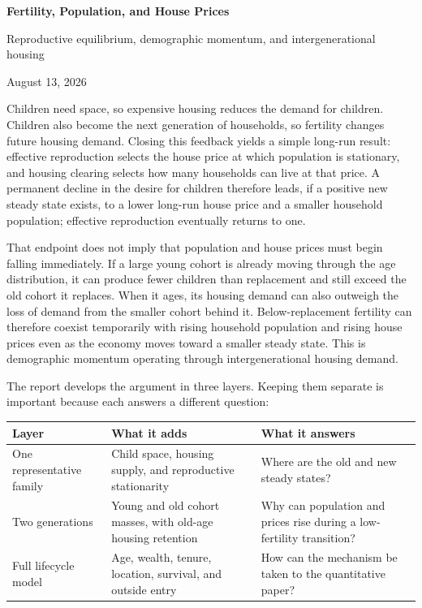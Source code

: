 \documentclass[11pt]{article}
\theoremstyle{definition}
\begin{document}
\begin{center}
{\LARGE\bfseries Fertility, Population, and House Prices}\par
\vspace{3pt}
{\large Reproductive equilibrium, demographic momentum, and intergenerational housing}\par
\vspace{3pt}
{\small August 13, 2026}
\end{center}

\vspace{-2pt}
Children need space, so expensive housing reduces the demand for children.
Children also become the next generation of households, so fertility changes
future housing demand. Closing this feedback yields a simple long-run result:
effective reproduction selects the house price at which population is
stationary, and housing clearing selects how many households can live at that
price. A permanent decline in the desire for children therefore leads, if a
positive new steady state exists, to a lower long-run house price and a smaller
household population; effective reproduction eventually returns to one.

That endpoint does not imply that population and house prices must begin
falling immediately. If a large young cohort is already moving through the age
distribution, it can produce fewer children than replacement and still exceed
the old cohort it replaces. When it ages, its housing demand can also outweigh
the loss of demand from the smaller cohort behind it. Below-replacement
fertility can therefore coexist temporarily with rising household population
and rising house prices even as the economy moves toward a smaller steady
state. This is demographic momentum operating through intergenerational
housing demand.

The report develops the argument in three layers. Keeping them separate is
important because each answers a different question:

\begin{center}
\small
\begin{tabularx}{0.96\textwidth}{@{}
>{\raggedright\arraybackslash}p{}
>{\raggedright\arraybackslash}p{}
>{\raggedright\arraybackslash}X@{}}
\toprule
Layer & What it adds & What it answers \\
\midrule
One representative family & Child space, housing supply, and reproductive
stationarity & Where are the old and new steady states? \\
Two generations & Young and old cohort masses, with old-age housing retention
& Why can population and prices rise during a low-fertility transition? \\
Full lifecycle model & Age, wealth, tenure, location, survival, and outside
entry & How can the mechanism be taken to the quantitative paper? \\
\bottomrule
\end{tabularx}
\end{center}
\end{document}
